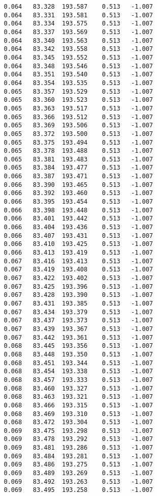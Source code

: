 \begin{verbatim}
   0.064   83.328  193.587    0.513   -1.007
   0.064   83.331  193.581    0.513   -1.007
   0.064   83.334  193.575    0.513   -1.007
   0.064   83.337  193.569    0.513   -1.007
   0.064   83.340  193.563    0.513   -1.007
   0.064   83.342  193.558    0.513   -1.007
   0.064   83.345  193.552    0.513   -1.007
   0.064   83.348  193.546    0.513   -1.007
   0.064   83.351  193.540    0.513   -1.007
   0.064   83.354  193.535    0.513   -1.007
   0.065   83.357  193.529    0.513   -1.007
   0.065   83.360  193.523    0.513   -1.007
   0.065   83.363  193.517    0.513   -1.007
   0.065   83.366  193.512    0.513   -1.007
   0.065   83.369  193.506    0.513   -1.007
   0.065   83.372  193.500    0.513   -1.007
   0.065   83.375  193.494    0.513   -1.007
   0.065   83.378  193.488    0.513   -1.007
   0.065   83.381  193.483    0.513   -1.007
   0.065   83.384  193.477    0.513   -1.007
   0.066   83.387  193.471    0.513   -1.007
   0.066   83.390  193.465    0.513   -1.007
   0.066   83.392  193.460    0.513   -1.007
   0.066   83.395  193.454    0.513   -1.007
   0.066   83.398  193.448    0.513   -1.007
   0.066   83.401  193.442    0.513   -1.007
   0.066   83.404  193.436    0.513   -1.007
   0.066   83.407  193.431    0.513   -1.007
   0.066   83.410  193.425    0.513   -1.007
   0.066   83.413  193.419    0.513   -1.007
   0.067   83.416  193.413    0.513   -1.007
   0.067   83.419  193.408    0.513   -1.007
   0.067   83.422  193.402    0.513   -1.007
   0.067   83.425  193.396    0.513   -1.007
   0.067   83.428  193.390    0.513   -1.007
   0.067   83.431  193.385    0.513   -1.007
   0.067   83.434  193.379    0.513   -1.007
   0.067   83.437  193.373    0.513   -1.007
   0.067   83.439  193.367    0.513   -1.007
   0.067   83.442  193.361    0.513   -1.007
   0.068   83.445  193.356    0.513   -1.007
   0.068   83.448  193.350    0.513   -1.007
   0.068   83.451  193.344    0.513   -1.007
   0.068   83.454  193.338    0.513   -1.007
   0.068   83.457  193.333    0.513   -1.007
   0.068   83.460  193.327    0.513   -1.007
   0.068   83.463  193.321    0.513   -1.007
   0.068   83.466  193.315    0.513   -1.007
   0.068   83.469  193.310    0.513   -1.007
   0.068   83.472  193.304    0.513   -1.007
   0.069   83.475  193.298    0.513   -1.007
   0.069   83.478  193.292    0.513   -1.007
   0.069   83.481  193.286    0.513   -1.007
   0.069   83.484  193.281    0.513   -1.007
   0.069   83.486  193.275    0.513   -1.007
   0.069   83.489  193.269    0.513   -1.007
   0.069   83.492  193.263    0.513   -1.007
   0.069   83.495  193.258    0.513   -1.007

\end{verbatim}
